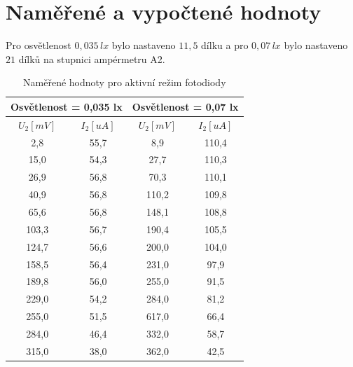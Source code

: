 \documentclass[12pt]{article} %
\begin{document}
\section{Naměřené a vypočtené hodnoty}

Pro osvětlenost $0,035\,lx$ bylo nastaveno $11,5$ dílku a pro $0,07\,lx$ bylo nastaveno $21$ dílků na stupnici ampérmetru A2.

\begin{table}[H]
\caption{Naměřené hodnoty pro aktivní režim fotodiody}
\begin{tabular}{|c|c|c|c|}
\hline 
\multicolumn{2}{|c|}{Osvětlenost = 0,035 lx} & \multicolumn{2}{|c|}{Osvětlenost = 0,07 lx} \\ 
\hline 
$U_2 [mV]$ & $I_2 [uA]$ & $U_2 [mV]$ & $I_2 [uA]$ \\ 
\hline 
2,8 & 55,7 & 8,9 & 110,4 \\ 
\hline 
15,0 & 54,3 & 27,7 & 110,3 \\ 
\hline 
26,9 & 56,8 & 70,3 & 110,1 \\ 
\hline 
40,9 & 56,8 & 110,2 & 109,8 \\ 
\hline 
65,6 & 56,8 & 148,1 & 108,8 \\ 
\hline 
103,3 & 56,7 & 190,4 & 105,5 \\ 
\hline 
124,7 & 56,6 & 200,0 & 104,0 \\ 
\hline 
158,5 & 56,4 & 231,0 & 97,9 \\ 
\hline 
189,8 & 56,0 & 255,0 & 91,5 \\ 
\hline 
229,0 & 54,2 & 284,0 & 81,2 \\ 
\hline 
255,0 & 51,5 & 617,0 & 66,4 \\ 
\hline 
284,0 & 46,4 & 332,0 & 58,7 \\ 
\hline 
315,0 & 38,0 & 362,0 & 42,5 \\ 
\hline 
\end{tabular} 
\end{table}
\end{document}
